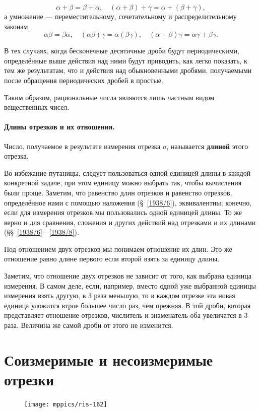 \documentclass[twoside]{book}
\makeatletter
\newcommand{\rindex}[2][\imki@jobname]{%
  \index[#1]{\detokenize{#2}}%
}
\makeatother
\begin{document}
\[\alpha+\beta=\beta+\alpha,
\quad
(\alpha+\beta)+\gamma=\alpha+(\beta+\gamma),
\]
а умножение — переместительному, сочетательному и распределительному законам.
\[\alpha\beta=\beta\alpha,
\quad
(\alpha\beta)\gamma=\alpha(\beta\gamma),
\quad
(\alpha+\beta)\gamma=\alpha\gamma+\beta\gamma.
\]

В тех случаях, когда бесконечные десятичные дроби будут периодическими, определённые выше действия над ними будут приводить, как легко показать, к тем же результатам, что и действия над обыкновенными дробями, получаемыми после обращения периодических дробей в простые.

Таким образом, рациональные числа являются лишь частным видом вещественных чисел.
 
\paragraph{Длины отрезков и их отношения.}\label{1938/155}
Число, получаемое в результате измерения отрезка $a$, называется \rindex{длина}\textbf{длиной} этого отрезка.

Во избежание путаницы, следует пользоваться одной единицей длины в каждой конкретной задаче,
при этом единицу можно выбрать так, чтобы вычисления были проще.
Заметим, что равенство длин отрезков и равенство отрезков, определённое нами с помощью наложения (§~\ref{1938/6}), эквивалентны;
конечно, если для измерения отрезков мы пользовались одной единицей длины.
То же верно и для сравнения, сложения и других действий над отрезками и их длинами (§§~\ref{1938/6}---\ref{1938/8}).


Под отношением двух отрезков мы понимаем отношение их длин. 
Это же отношение равно длине первого если второй взять за единицу длины.

Заметим, что отношение двух отрезков не зависит от того, как выбрана единица измерения.
В самом деле, если, например, вместо одной уже выбранной единицы измерения взять другую, в 3 раза меньшую, то в каждом отрезке эта новая единица уложится втрое большее число раз, чем прежняя.
В той дроби, которая представляет отношение отрезков, числитель и знаменатель оба увеличатся в 3 раза.
Величина же самой дроби от этого не изменится.

\section{Соизмеримые и несоизмеримые отрезки}

\begin{figure}
\centering
\texttt{[image: mppics/ris-162]}
\caption{}\label{1938/ris-162}
\end{figure}
\end{document}

